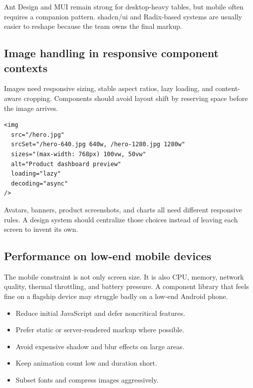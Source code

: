 Ant Design and MUI remain strong for desktop-heavy tables, but mobile often requires a companion pattern. shadcn/ui and Radix-based systems are usually easier to reshape because the team owns the final markup.

\subsection{Image handling in responsive component contexts}
Images need responsive sizing, stable aspect ratios, lazy loading, and content-aware cropping. Components should avoid layout shift by reserving space before the image arrives.

\begin{verbatim}
<img
  src="/hero.jpg"
  srcSet="/hero-640.jpg 640w, /hero-1280.jpg 1280w"
  sizes="(max-width: 768px) 100vw, 50vw"
  alt="Product dashboard preview"
  loading="lazy"
  decoding="async"
/>
\end{verbatim}

Avatars, banners, product screenshots, and charts all need different responsive rules. A design system should centralize those choices instead of leaving each screen to invent its own.

\subsection{Performance on low-end mobile devices}
The mobile constraint is not only screen size. It is also CPU, memory, network quality, thermal throttling, and battery pressure. A component library that feels fine on a flagship device may struggle badly on a low-end Android phone.

\begin{itemize}[leftmargin=*, itemsep=0.35em]
  \item Reduce initial JavaScript and defer noncritical features.
  \item Prefer static or server-rendered markup where possible.
  \item Avoid expensive shadow and blur effects on large areas.
  \item Keep animation count low and duration short.
  \item Subset fonts and compress images aggressively.
\end{itemize}

